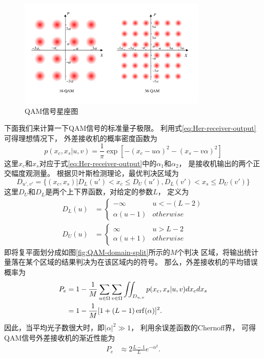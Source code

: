 \begin{figure}
\centering
  \includegraphics[width=0.8\textwidth]{figures/chap3/QAM-signals}
  \caption{QAM信号星座图}
  \label{fig:QAM-signals}
\end{figure}


下面我们来计算一下QAM信号的标准量子极限。
利用式\ref{eq:Her-receiver-output}可得理想情况下，
外差接收机的概率密度函数为\cite{kato1999quantum}
\begin{equation}
p(x_c, x_s| u, v) = \frac{1}{\pi} \exp[-(x_c - u\alpha)^2 - (x_s - v\alpha)^2]
\end{equation}
这里$x_c$和$x_s$对应于式\ref{eq:Her-receiver-output}中的$\alpha_1$和$\alpha_2$，
是接收机输出的两个正交幅度观测量。
根据贝叶斯检测理论，最优判决区域为
\begin{equation}
D_{u',v'} = \{ (x_c,x_s)| D_L(u') < x_c \le D_U(u'),  D_L(v') < x_s \le D_U(v') \}
\end{equation}
这里$D_U$和$D_L$是两个上下界函数，对给定的参数$L$，
定义为
\begin{equation}
\begin{split}
D_L(u) &= \begin{cases}    
          -\infty     & u < -(L-2)  \\
          \alpha(u-1) & otherwise
         \end{cases}\\
D_U(u) &= \begin{cases} 
          \infty     & u > L-2  \\
          \alpha(u+1) & otherwise
         \end{cases}
\end{split}
\end{equation}
即将复平面划分成如图\ref{fig:QAM-domain-split}所示的$M$个判决
区域，将输出统计量落在某个区域的结果判决为在该区域内的符号。
那么，外差接收机的平均错误概率为
\begin{equation}
\begin{split}
P_e &= 1 - \frac{1}{M} \sum_{u\in\Omega}\sum_{v\in\Omega} \iint_{D_{u,v}} p(x_c,x_s|u,v) dx_c dx_s \\
    &= 1 - \frac{1}{M}[1+(L-1) \erf(\alpha)]^2.
\end{split}
\end{equation}
因此，当平均光子数很大时，即$|\alpha|^2 \gg 1$，
利用余误差函数的Chernoff界\cite{chang2011chernoff}，
可得QAM信号外差接收机的渐近性能为
\begin{equation}
\begin{split}
P_e &\approx 2\frac{L-1}{L} e^{-\alpha^2}.
\end{split}
\end{equation}

